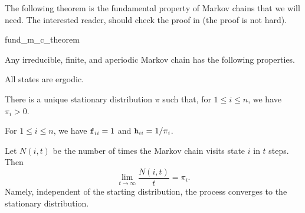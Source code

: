 The following theorem is the fundamental property of Markov chains
that we will need. The interested reader, should check the proof in
\cite{n-mc-98} (the proof is not hard).
\begin{fragment}{fund_m_c_theorem}
    \begin{theorem}
        \hfill\break Any irreducible, finite, and aperiodic Markov chain has
        the following properties.
        \begin{compactenumi}
            \item All states are ergodic.
            
            \item There is a unique stationary distribution $\pi$ such
            that, for $1 \leq i \leq n$, we have $\pi_i > 0$.
            
            \item For $1 \leq i \leq n$, we have $\mathtt{f}_{ii} =1$
            and $\mathtt{h}_{ii} = 1/ \pi_i$.
            
            \item Let $N(i,t)$ be the number of times the Markov chain
            visits state $i$ in $t$ steps. Then
            \begin{equation*}
                \lim_{t \rightarrow \infty} \frac{N(i,t)}{t} = \pi_i.
            \end{equation*}
            Namely, independent of the starting distribution, the
            process converges to the stationary distribution.
        \end{compactenumi}
    \end{theorem}
\end{fragment}
%  



\ChapterEnd{}


